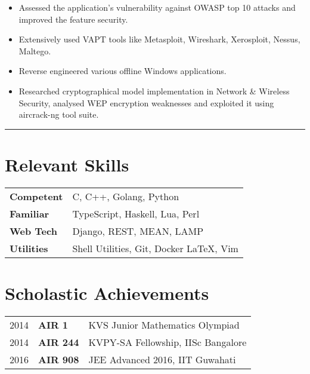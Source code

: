 \documentclass[10pt, margin=0.5in]{deedy-resume-openfont}
\begin{document}
\begin{minipage}[t]{0.48\textwidth}
\vspace{5pt}
\begin{itemize}[leftmargin=*, noitemsep]
  \item Assessed the application's vulnerability against OWASP top 10 attacks and improved the feature security.
  \item Extensively used VAPT tools like Metasploit, Wireshark, Xerosploit, Nessus, Maltego.
  \item Reverse engineered various offline Windows applications.
  \item	Researched cryptographical model implementation in Network \& Wireless Security, analysed WEP encryption weaknesses and exploited it using aircrack-ng tool suite.
\end{itemize}


\vspace{-2pt}				%
\rule{\textwidth}{0.5pt}	%
\vspace{-14pt}				%

%
%
\section{Relevant Skills}
\vspace{0pt}
\begin{tabular}{ll}
 \textbf{Competent}  & C, C++, Golang, Python \\
 \textbf{Familiar}   & TypeScript, Haskell, Lua, Perl \\
 \textbf{Web Tech}   & Django, REST, MEAN, LAMP \\
 \textbf{Utilities}  & Shell Utilities, Git, Docker \LaTeX, Vim
\end{tabular}


%
%
\section{Scholastic Achievements}
\vspace{0pt}
\begin{tabular}{lll}
  2014	   & \textbf{AIR 1}  & KVS Junior Mathematics Olympiad\\
  2014	   & \textbf{AIR 244}& KVPY-SA Fellowship, IISc Bangalore \\
  2016     & \textbf{AIR 908}& JEE Advanced 2016, IIT Guwahati \\
\end{tabular}


\end{minipage}
\end{document}
